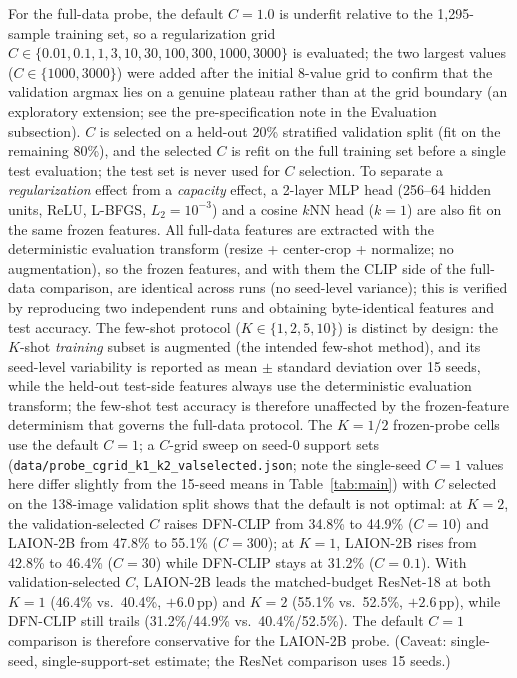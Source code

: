 \documentclass[10pt,a4paper]{article}
\begin{document}
For the full-data probe, the default $C{=}1.0$ is underfit relative to the 1,295-sample training set, so a regularization grid $C\in\{0.01,0.1,1,3,10,30,100,300,1000,3000\}$ is evaluated; the two largest values ($C\in\{1000,3000\}$) were added after the initial 8-value grid to confirm that the validation argmax lies on a genuine plateau rather than at the grid boundary (an exploratory extension; see the pre-specification note in the Evaluation subsection). $C$ is selected on a held-out 20\% stratified validation split (fit on the remaining 80\%), and the selected $C$ is refit on the full training set before a single test evaluation; the test set is never used for $C$ selection. To separate a \emph{regularization} effect from a \emph{capacity} effect, a 2-layer MLP head (256--64 hidden units, ReLU, L-BFGS, $L_2{=}10^{-3}$) and a cosine $k$NN head ($k{=}1$) are also fit on the same frozen features. All full-data features are extracted with the deterministic evaluation transform (resize + center-crop + normalize; no augmentation), so the frozen features, and with them the CLIP side of the full-data comparison, are identical across runs (no seed-level variance); this is verified by reproducing two independent runs and obtaining byte-identical features and test accuracy. The few-shot protocol ($K\in\{1,2,5,10\}$) is distinct by design: the $K$-shot \emph{training} subset is augmented (the intended few-shot method), and its seed-level variability is reported as mean $\pm$ standard deviation over 15 seeds, while the held-out test-side features always use the deterministic evaluation transform; the few-shot test accuracy is therefore unaffected by the frozen-feature determinism that governs the full-data protocol. The $K{=}1$/$2$ frozen-probe cells use the default $C{=}1$; a $C$-grid sweep on seed-0 support sets (\texttt{data/probe\_cgrid\_k1\_k2\_valselected.json}; note the single-seed $C{=}1$ values here differ slightly from the 15-seed means in Table~\ref{tab:main}) with $C$ selected on the 138-image validation split shows that the default is not optimal: at $K{=}2$, the validation-selected $C$ raises DFN-CLIP from 34.8\% to 44.9\% ($C{=}10$) and LAION-2B from 47.8\% to 55.1\% ($C{=}300$); at $K{=}1$, LAION-2B rises from 42.8\% to 46.4\% ($C{=}30$) while DFN-CLIP stays at 31.2\% ($C{=}0.1$). With validation-selected $C$, LAION-2B leads the matched-budget ResNet-18 at both $K{=}1$ (46.4\% vs.\ 40.4\%, $+6.0$\,pp) and $K{=}2$ (55.1\% vs.\ 52.5\%, $+2.6$\,pp), while DFN-CLIP still trails (31.2\%/44.9\% vs.\ 40.4\%/52.5\%). The default $C{=}1$ comparison is therefore conservative for the LAION-2B probe. (Caveat: single-seed, single-support-set estimate; the ResNet comparison uses 15 seeds.)
\end{document}
